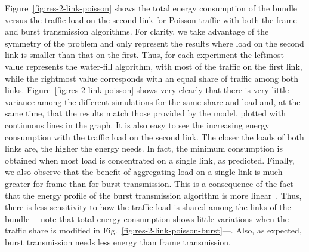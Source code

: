 \documentclass[journal,english,twocolumn,10pt,letterpaper]{IEEEtran}
\newcommand{\added}[1]{{#1}}
\begin{document}
\begin{figure*}
  \centering
  \caption{Results for a 2-link bundle with Poisson traffic as a function of
    excess traffic load on the second link.}
  \label{fig:res-2-link-poisson}
\end{figure*}
Figure~\ref{fig:res-2-link-poisson} shows the total energy consumption of the
bundle versus the traffic load on the second link for Poisson traffic with
both the frame and burst transmission algorithms. For clarity, we take
advantage of the symmetry of the problem and only represent the results where
load on the second link is smaller than that on the first. \added{Thus, for
  each experiment the leftmost value represents the water-fill algorithm, with
  most of the traffic on the first link, while the rightmost value corresponds
  with an equal share of traffic among both links.}
Figure~\ref{fig:res-2-link-poisson} shows very clearly that there is very
little variance among the different simulations for the same share and load
and, at the same time, that the results match those provided by the model,
plotted with continuous lines in the graph. It is also easy to see the
increasing energy consumption with the traffic load on the second link. The
closer the loads of both links are, the higher the energy needs. In fact, the
minimum consumption is obtained when most load is concentrated on a single
link, as predicted. Finally, we also observe that the benefit of aggregating
load on a single link is much greater for frame than for burst transmission.
This is a consequence of the fact that the energy profile of the burst
transmission algorithm is more
linear\added{~\cite{christensen10:_the_road_to_eee}. Thus, there is less
  sensitivity to how the traffic load is shared among the links of the bundle
  ---note that total energy consumption shows little variations when the
  traffic share is modified in Fig.~\ref{fig:res-2-link-poisson-burst}---.}
Also, as expected, burst transmission needs less energy than frame
transmission.
\end{document}
